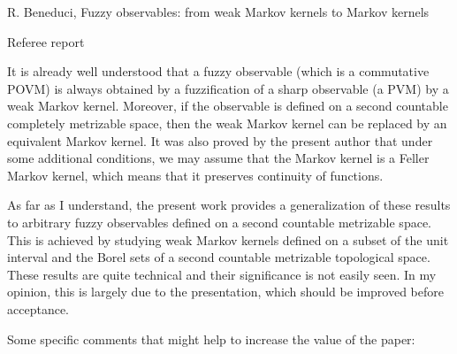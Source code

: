 \documentclass[12pt]{article}
\begin{document}
\begin{center}
{\large   R. Beneduci, Fuzzy observables: from weak Markov kernels to Markov kernels}

\end{center}
\medskip

\centerline{Referee report}

\bigskip

It is already well understood that a fuzzy observable (which is a  commutative POVM) is
always obtained by a fuzzification of a sharp observable (a PVM) by a weak Markov kernel. Moreover, if the
observable is defined on a second countable completely metrizable space, then the weak Markov kernel can be
replaced by an equivalent  Markov kernel.  It was also proved by the present author that
under some additional conditions, we may assume that the Markov kernel is a Feller Markov
kernel, which means that it preserves continuity of functions.

As far as I understand, the present work provides a generalization of these results to arbitrary fuzzy observables
defined on a second countable metrizable space. This is achieved by studying weak Markov
kernels defined on a subset of the unit interval and the Borel sets of a  second countable
metrizable topological space. These results are quite technical and their significance is
not easily seen. In my opinion, this is largely due to  the
presentation, which should be improved before acceptance.

\medskip

\noindent

Some specific comments that might help to increase the value of the paper:
\medskip
\end{document}
